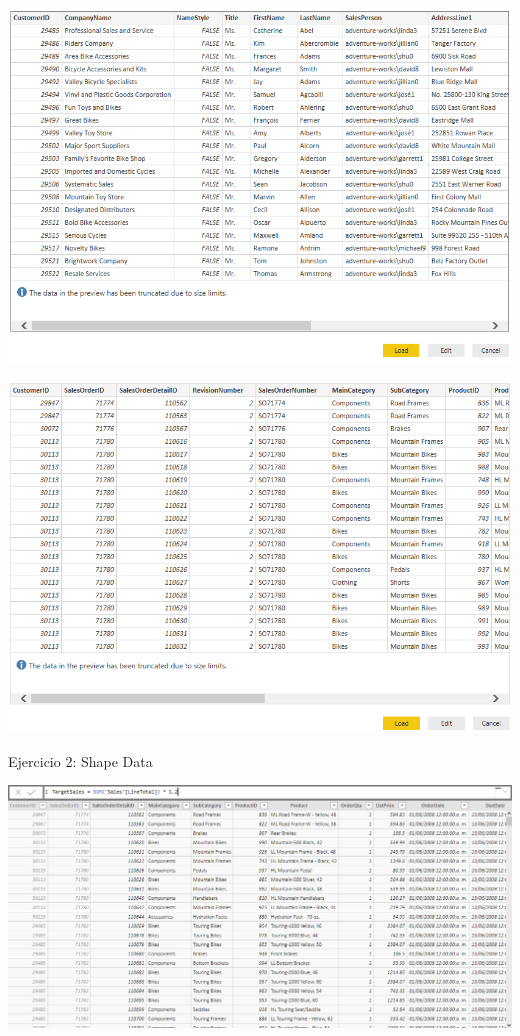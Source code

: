 	\begin{center}
	\includegraphics[width=15cm]{./images/power3}
	\end{center}	

	\begin{center}
	\includegraphics[width=15cm]{./images/power4}
	\end{center}	
\pagebreak
Ejercicio 2: Shape Data\\
	\begin{center}
	\includegraphics[width=15cm]{./images/power5}
	\end{center}	

